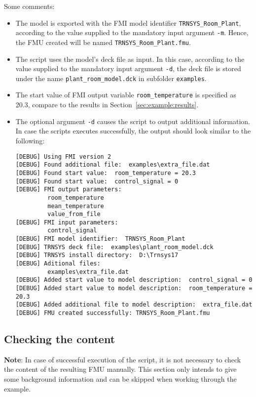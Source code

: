 Some comments:
\begin{itemize}
  \item The model is exported with the FMI model identifier \verb!TRNSYS_Room_Plant!, according to the value supplied to the mandatory input argument \verb!-m!.
  Hence, the FMU created will be named \verb!TRNSYS_Room_Plant.fmu!.

  \item The \python script uses the model's deck file as input.
  In this case, according to the value supplied to the mandatory input argument \verb!-d!, the deck file is stored under the name \verb!plant_room_model.dck! in subfolder \texttt{examples}.
  
  \item The start value of FMI output variable \verb!room_temperature! is specified as 20.3, compare to the results in Section~\ref{sec:example:results}.
  
  \item The optional argument \verb!-d! causes the script to output additional information. In case the scripts executes successfully, the output should look similar to the following:
\begin{verbatim}
[DEBUG] Using FMI version 2
[DEBUG] Found additional file:  examples\extra_file.dat
[DEBUG] Found start value:  room_temperature = 20.3
[DEBUG] Found start value:  control_signal = 0
[DEBUG] FMI output parameters:
         room_temperature
         mean_temperature
         value_from_file
[DEBUG] FMI input parameters:
         control_signal
[DEBUG] FMI model identifier:  TRNSYS_Room_Plant
[DEBUG] TRNSYS deck file:  examples\plant_room_model.dck
[DEBUG] TRNSYS install directory:  D:\Trnsys17
[DEBUG] Aditional files:
         examples\extra_file.dat
[DEBUG] Added start value to model description:  control_signal = 0
[DEBUG] Added start value to model description:  room_temperature = 20.3
[DEBUG] Added additional file to model description:  extra_file.dat
[DEBUG] FMU created successfully: TRNSYS_Room_Plant.fmu
\end{verbatim}

\end{itemize}


\subsection{Checking the content}

\textbf{Note}: In case of successful execution of the script, it is not necessary to check the content of the resulting FMU manually.
This section only intends to give some background information and can be skipped when working through the example.


